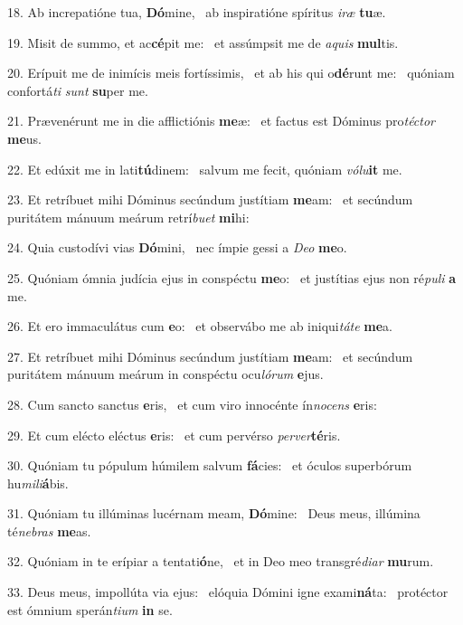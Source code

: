 18. Ab increpatióne tua, \textbf{Dó}mine, \ast\  ab inspiratióne spíritus \textit{i}\textit{ræ} \textbf{tu}æ.\

19. Misit de summo, et ac\textbf{cé}pit me: \ast\  et assúmpsit me de \textit{a}\textit{quis} \textbf{mul}tis.\

20. Erípuit me de inimícis meis fortíssimis, \dag\  et ab his qui o\textbf{dé}runt me: \ast\  quóniam confortá\textit{ti} \textit{sunt} \textbf{su}per me.\

21. Prævenérunt me in die afflictiónis \textbf{me}æ: \ast\  et factus est Dóminus pro\textit{téc}\textit{tor} \textbf{me}us.\

22. Et edúxit me in lati\textbf{tú}dinem: \ast\  salvum me fecit, quóniam \textit{vó}\textit{lu}\textbf{it} me.\

23. Et retríbuet mihi Dóminus secúndum justítiam \textbf{me}am: \ast\  et secúndum puritátem mánuum meárum retrí\textit{bu}\textit{et} \textbf{mi}hi:\

24. Quia custodívi vias \textbf{Dó}mini, \ast\  nec ímpie gessi a \textit{De}\textit{o} \textbf{me}o.\

25. Quóniam ómnia judícia ejus in conspéctu \textbf{me}o: \ast\  et justítias ejus non ré\textit{pu}\textit{li} \textbf{a} me.\

26. Et ero immaculátus cum \textbf{e}o: \ast\  et observábo me ab iniqui\textit{tá}\textit{te} \textbf{me}a.\

27. Et retríbuet mihi Dóminus secúndum justítiam \textbf{me}am: \ast\  et secúndum puritátem mánuum meárum in conspéctu ocu\textit{ló}\textit{rum} \textbf{e}jus.\

28. Cum sancto sanctus \textbf{e}ris, \ast\  et cum viro innocénte ín\textit{no}\textit{cens} \textbf{e}ris:\

29. Et cum elécto eléctus \textbf{e}ris: \ast\  et cum pervérso \textit{per}\textit{ver}\textbf{té}ris.\

30. Quóniam tu pópulum húmilem salvum \textbf{fá}cies: \ast\  et óculos superbórum hu\textit{mi}\textit{li}\textbf{á}bis.\

31. Quóniam tu illúminas lucérnam meam, \textbf{Dó}mine: \ast\  Deus meus, illúmina té\textit{ne}\textit{bras} \textbf{me}as.\

32. Quóniam in te erípiar a tentati\textbf{ó}ne, \ast\  et in Deo meo transgré\textit{di}\textit{ar} \textbf{mu}rum.\

33. Deus meus, impollúta via ejus: \dag\  elóquia Dómini igne exami\textbf{ná}ta: \ast\  protéctor est ómnium sperán\textit{ti}\textit{um} \textbf{in} se.\

